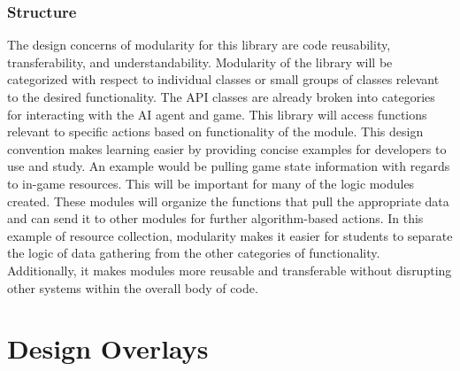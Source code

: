 \documentclass[10pt,letterpaper,onecolumn,draftclsnofoot]{IEEEtran}
\begin{document}
\subsubsection{Structure}
	The design concerns of modularity for this library are code reusability, transferability, and understandability. Modularity of the library will be categorized with respect to individual classes or small groups of classes relevant to the desired functionality. The API classes are already broken into categories for interacting with the AI agent and game. This library will access functions relevant to specific actions based on functionality of the module. This design convention makes learning easier by providing concise examples for developers to use and study.
	An example would be pulling game state information with regards to in-game resources. This will be important for many of the logic modules created. These modules will organize the functions that pull the appropriate data and can send it to other modules for further algorithm-based actions. In this example of resource collection, modularity makes it easier for students to separate the logic of data gathering from the other categories of functionality. Additionally, it makes modules more reusable and transferable without disrupting other systems within the overall body of code.

\section{Design Overlays}
\end{document}
